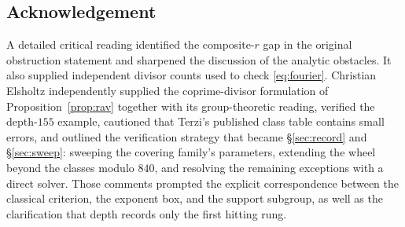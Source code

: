 \documentclass[11pt]{article}
\theoremstyle{definition}
\theoremstyle{remark}
\begin{document}
\subsection*{Acknowledgement}
A detailed critical reading identified the composite-$r$ gap in the original
obstruction statement and sharpened the discussion of the analytic obstacles. It also
supplied independent divisor counts used to check \eqref{eq:fourier}. Christian
Elsholtz \cite{ElsholtzPC2026} independently supplied the coprime-divisor formulation
of Proposition~\ref{prop:rav} together with its group-theoretic reading, verified the
depth-$155$ example, cautioned that Terzi's published class table contains small
errors, and outlined the verification strategy that became \S\ref{sec:record} and
\S\ref{sec:sweep}: sweeping the covering family's parameters, extending the wheel
beyond the classes modulo $840$, and resolving the remaining exceptions with a direct
solver. Those comments prompted the explicit correspondence between the classical
criterion, the exponent box, and the support subgroup, as well as the clarification
that depth records only the first hitting rung.
\end{document}
